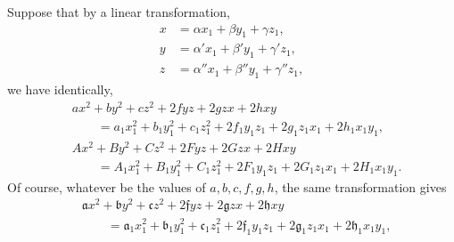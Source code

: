 \documentclass[10pt]{article}
\begin{document}
Suppose that by a linear transformation,
\[
\begin{aligned}
x&=\alpha x_1+\beta y_1+\gamma z_1,\\
y&=\alpha'x_1+\beta'y_1+\gamma'z_1,\\
z&=\alpha''x_1+\beta''y_1+\gamma''z_1,
\end{aligned}
\]
we have identically,
\[
\begin{aligned}
&ax^2+by^2+cz^2+2fyz+2gzx+2hxy\\
&\qquad=a_1x_1^2+b_1y_1^2+c_1z_1^2+2f_1y_1z_1+2g_1z_1x_1+2h_1x_1y_1,\\[0.4em]
&Ax^2+By^2+Cz^2+2Fyz+2Gzx+2Hxy\\
&\qquad=A_1x_1^2+B_1y_1^2+C_1z_1^2+2F_1y_1z_1+2G_1z_1x_1+2H_1x_1y_1.
\end{aligned}
\]
Of course, whatever be the values of $a,b,c,f,g,h$, the same transformation gives
\[
\begin{aligned}
&\mathfrak{a}x^2+\mathfrak{b}y^2+\mathfrak{c}z^2
  +2\mathfrak{f}yz+2\mathfrak{g}zx+2\mathfrak{h}xy\\
&\qquad=\mathfrak{a}_1x_1^2+\mathfrak{b}_1y_1^2+\mathfrak{c}_1z_1^2
  +2\mathfrak{f}_1y_1z_1+2\mathfrak{g}_1z_1x_1+2\mathfrak{h}_1x_1y_1,
\end{aligned}
\]
\end{document}

